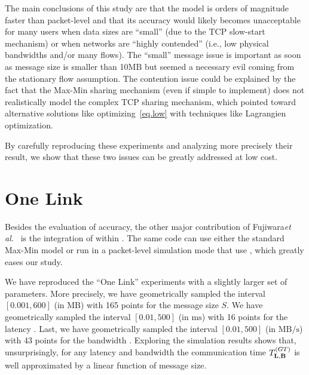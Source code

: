 \documentclass{sig-alternate}
\def\etal{\emph{et al.}\xspace}
\def\ms{\ensuremath{\text{ms}}\xspace}%
\def\MBps{\ensuremath{\text{MB}/\text{s}}\xspace}%
\def\MB{\ensuremath{\text{MB}}\xspace}%
\begin{document}
The main conclusions of this study are that the \simgrid model is
orders of magnitude faster than packet-level and that
its accuracy would likely becomes unacceptable for many users when
data sizes are ``small'' (due to the TCP slow-start mechanism) or when
networks are ``highly contended'' (i.e., low physical bandwidths
and/or many flows). The ``small'' message issue is important as soon
as message size is smaller than 10\MB but seemed a necessary evil
coming from the stationary flow assumption. The contention issue
could be explained by the fact that the Max-Min sharing mechanism
(even if simple to implement) does not realistically  model the complex TCP
sharing mechanism, which pointed toward alternative solutions like
optimizing~\eqref{eq.low} with techniques like Lagrangien optimization.

By carefully reproducing these experiments and analyzing more
precisely their result, we show that these two issues can be greatly
addressed at low cost.

\newpage
\section{One Link}
\label{sec.onelink}
\newcommand{\tGT}[1][]{\ensuremath{T_{#1}^{(GT)}}\xspace}
\newcommand{\tSG}[1][]{\ensuremath{T_{#1}^{(SG)}}\xspace}
\newcommand{\tSGN}[1][]{\ensuremath{T_{#1}^{(new)}}\xspace}
\newcommand{\thGT}[1][]{\ensuremath{Th_{#1}^{(GT)}}\xspace}
\newcommand{\thSG}[1][]{\ensuremath{Th_{#1}^{(SG)}}\xspace}
\newcommand{\thSGN}[1][]{\ensuremath{Th_{#1}^{(new)}}\xspace}

Besides the evaluation of \simgrid accuracy, the other major
contribution of Fujiwara\etal~\cite{nstools07} is the integration of
\gtnets within \simgrid. The same \simgrid code can use either the
standard Max-Min model or run in a packet-level simulation mode that
use \gtnets, which greatly eases our study.

We have reproduced the ``One Link'' experiments with a slightly larger
set of parameters. More precisely, we have geometrically sampled the
interval $[0.001,600]$ (in \MB) with 165 points for the message size
$S$. We have geometrically sampled the interval $[0.01,500]$ (in \ms)
with 16 points for the latency \LOneLink. Last, we have geometrically
sampled the interval $[0.01,500]$ (in \MBps) with 43 points for the
bandwidth \BOneLink. Exploring the simulation results shows that,
unsurprisingly, for any latency and bandwidth the \gtnets
communication time \tGT[\LOneLink,\BOneLink] is well approximated by a
linear function of message size.
\end{document}
